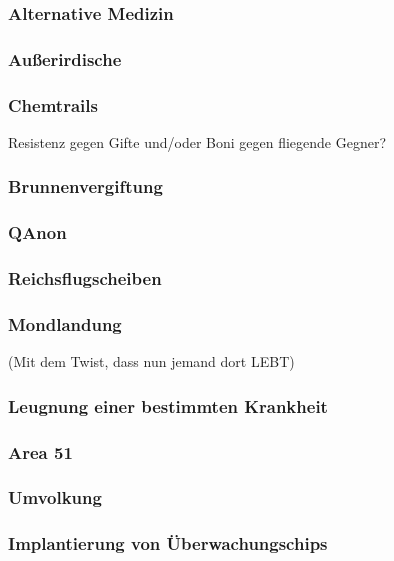 \documentclass[
	ngerman,
	a4paper,
	11pt,
	twocolumn,
]{scrartcl}
\begin{document}
\subsubsection*{Alternative Medizin}

\subsubsection*{Außerirdische}



\subsubsection*{Chemtrails} Resistenz gegen Gifte und/oder Boni gegen fliegende Gegner?

\subsubsection*{Brunnenvergiftung}

\subsubsection*{QAnon}

\subsubsection*{Reichsflugscheiben}

\subsubsection*{Mondlandung} (Mit dem Twist, dass nun jemand dort LEBT)

\subsubsection*{Leugnung einer bestimmten Krankheit}

\subsubsection*{Area 51}

\subsubsection*{Umvolkung}

\subsubsection*{Implantierung von Überwachungschips}
\end{document}
